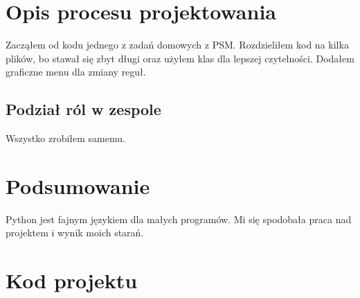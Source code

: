 \documentclass{article}
\begin{document}
\section{Opis procesu projektowania}
Zacząłem od kodu jednego z zadań domowych z PSM. Rozdzieliłem kod na kilka plików,
bo stawał się zbyt długi oraz użyłem klas dla lepszej czytelności. Dodałem graficzne menu
dla zmiany reguł.

\subsection{Podział ról w zespole}
Wszystko zrobiłem samemu.

\section{Podsumowanie}
Python jest fajnym językiem dla małych programów. Mi się spodobała praca nad projektem
i wynik moich starań.

\pagebreak

\section{Kod projektu}




\end{document}
